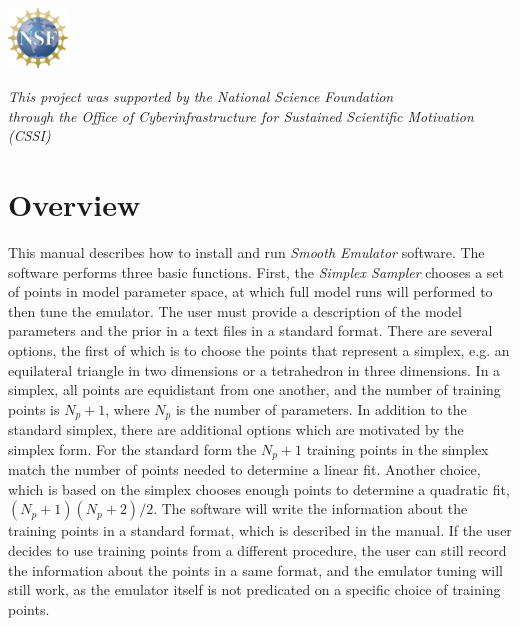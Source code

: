 \documentclass[12pt]{article}
\numberwithin{equation}{section}
\numberwithin{figure}{section}
\begin{document}
\begin{titlepage}
       
       
       \vspace*{-1.75cm}
       \hspace*{12.5cm}
       \includegraphics[width=0.12\textwidth]{figs/nsf_logo.png}

       

\begin{center}
{\it This project was supported by the National Science Foundation\\ through the Office of Cyberinfrastructure for Sustained Scientific Motivation (CSSI)}
\end{center}

\end{titlepage}

\newpage

\thispagestyle{empty}

\tableofcontents

\newpage

\thispagestyle{empty}

\section{Overview}\label{sec:overview}

This manual describes how to install and run {\it Smooth Emulator} software. The software performs three basic functions. First, the {\it {\it Simplex Sampler}} chooses a set of points in model parameter space, at which full model runs will performed to then tune the emulator. The user must provide a description of the model parameters and the prior in a text files in a standard format. There are several options, the first of which is to choose the points that represent a simplex, e.g. an equilateral triangle in two dimensions or a tetrahedron in three dimensions. In a simplex, all points are equidistant from one another, and the number of training points is $N_p+1$, where $N_p$ is the number of parameters. In addition to the standard simplex, there are additional options which are motivated by the simplex form. For the standard form the  $N_p+1$ training points in the simplex match the number of points needed to determine a linear fit. Another choice, which is based on the simplex chooses enough points to determine a quadratic fit, $(N_p+1)(N_p+2)/2$. The software will write the information about the training points in a standard format, which is described in the manual. If the user decides to use training points from a different procedure, the user can still record the information about the points in a same format, and the emulator tuning will still work, as the emulator itself is not predicated on a specific choice of training points.
\end{document}
